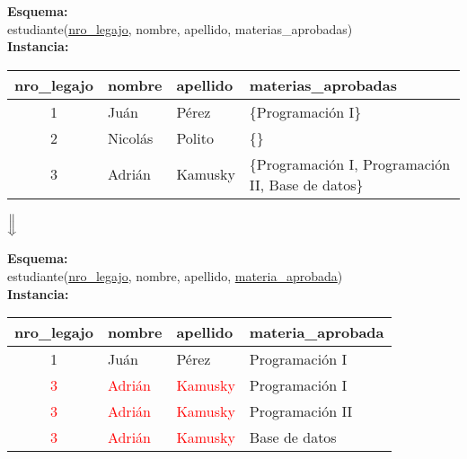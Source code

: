 \documentclass[preview]{standalone}
\begin{document}
\textbf{Esquema:}\\
estudiante(\underline{nro\_legajo}, nombre, apellido, materias\_aprobadas)\\

\textbf{Instancia:}
\begin{center}
\begin{tabular}{| c | l | l | l |}\hline			
	nro\_legajo & nombre & apellido & materias\_aprobadas \\\hline	
	1 & Ju\'an & P\'erez & \{\scriptsize{Programaci\'on I}\}\\
	2 & Nicol\'as & Polito & \{\}\\
	3 & Adri\'an & Kamusky & \{\scriptsize{Programaci\'on I, Programaci\'on II, Base de datos}\}\\\hline
\end{tabular}
\end{center}


\begin{center}
$\Big\Downarrow$
\end{center}
\textbf{Esquema:}\\
estudiante(\underline{nro\_legajo}, nombre, apellido, \underline{materia\_aprobada})\\

\textbf{Instancia:}
\begin{center}
\begin{tabular}{| c | l | l | l |}\hline			
	nro\_legajo & nombre & apellido & materia\_aprobada \\\hline			
	1 & Ju\'an & P\'erez & Programaci\'on I\\
	\textcolor{red}{3} & \textcolor{red}{Adri\'an} & \textcolor{red}{Kamusky} & Programaci\'on I\\
	\textcolor{red}{3} & \textcolor{red}{Adri\'an} & \textcolor{red}{Kamusky} & Programaci\'on II\\
	\textcolor{red}{3} & \textcolor{red}{Adri\'an} & \textcolor{red}{Kamusky} & Base de datos\\\hline
\end{tabular}
\end{center}
\end{document}
